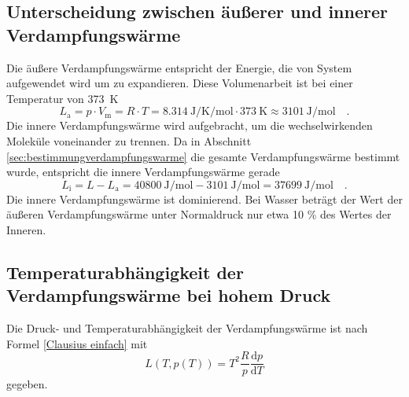 \subsection{Unterscheidung zwischen äußerer und innerer Verdampfungswärme}
Die äußere Verdampfungswärme entspricht der Energie, die von System aufgewendet wird um zu expandieren. Diese Volumenarbeit ist bei einer Temperatur von  \SI{373}{\kelvin}
\begin{equation}
L_\text{a} = p \cdot V_\text{m} = R \cdot T = \SI{8.314}{\joule\per\kelvin\per\mol} \cdot  \SI{373}{\kelvin} \approx \SI{3101}{\joule\per\mol} \quad.
\end{equation}
Die innere Verdampfungswärme wird aufgebracht, um die wechselwirkenden Moleküle voneinander zu trennen. Da in Abschnitt \ref{sec:bestimmungverdampfungswarme} die gesamte Verdampfungswärme bestimmt wurde, entspricht die innere Verdampfungswärme gerade
\begin{equation}
L_\text{i} = L - L_{\text{a}} = \SI{40800}{\joule\per\mol} - \SI{3101}{\joule\per\mol} = \SI{37699}{\joule\per\mol} \quad.
\end{equation}
Die innere Verdampfungswärme ist dominierend. Bei Wasser beträgt der Wert der äußeren Verdampfungswärme unter Normaldruck nur etwa 10 \% des Wertes der Inneren.\cite{TUGraz}




\subsection{Temperaturabhängigkeit der Verdampfungswärme bei hohem Druck}
Die Druck- und Temperaturabhängigkeit der Verdampfungswärme ist nach Formel \eqref{Clausius einfach} mit
\begin{equation}
	L(T, p(T)) = T^2\frac{R}{p}\frac{\text{d}p}{\text{d}T}
\end{equation} gegeben.

